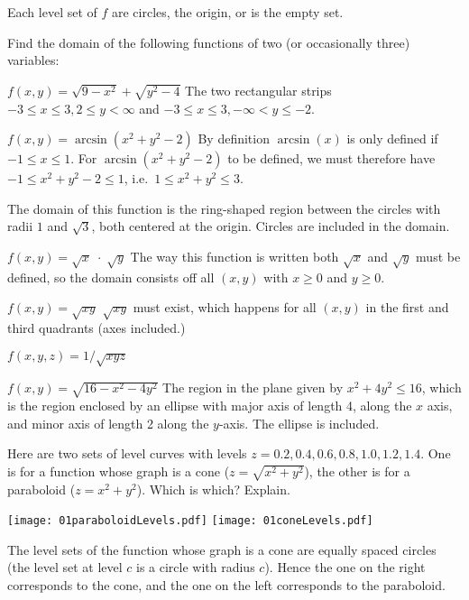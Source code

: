 Each level set of $f$ are circles, the origin, or is the empty set.


\endanswer


\problem Find the domain of the following functions of two (or occasionally
three) variables:

\subprob  $f(x, y) = \sqrt{9-x^2}+\sqrt{y^2-4}$\hspace{5em}
\answer
The two rectangular strips $-3\leq x\leq3, 2\leq y<\infty$ and
$-3\leq x\leq3, -\infty<y\leq-2$.
\endanswer

\subprob  $f(x, y) = \arcsin(x^2+y^2-2)$
\answer
By definition $\arcsin(x)$ is only defined if $-1\leq x\leq1$.
For $\arcsin(x^2+y^2-2)$ to be defined, we must therefore have
$-1\leq x^2+y^2-2 \leq 1$, i.e.\ $1\leq x^2+y^2 \leq 3$.

The domain of this function is 
the ring-shaped region between the circles with radii $1$ and
$\sqrt{3}$, both centered at the origin.
Circles are included in the domain.
\endanswer

\subprob  $f(x, y) = \sqrt{x}\;\cdot\;\sqrt{y}$
\answer
The way this function is written both $\sqrt x$ and $\sqrt y$ must be defined,
so the domain consists off all $(x,y)$ with $x\geq0$ and $y\geq0$. 
\endanswer

\subprob  $f(x, y) = \sqrt{xy}$
\answer
$\sqrt{xy}$ must exist, which happens for all $(x,y)$ in the first
and third quadrants (axes included.)
\endanswer

\subprob  $f(x, y, z) = 1/\sqrt{xyz}$

\subprob  $f(x, y) = \sqrt{16-x^2-4y^2}$
\answer
The region in the plane given by $x^2+4y^2\leq16$, which is the region
enclosed by an ellipse with
major axis of length 4, along the $x$ axis, and minor axis of length
2 along the $y$-axis.  The ellipse is included.
\endanswer

\problem\label{prb:cone-or-paraboloid}
Here are two sets of level curves with levels $z=0.2, 0.4, 0.6, 0.8,
1.0, 1.2,  1.4$.  One is for a function whose graph is a cone
($z=\sqrt{x^2+y^2}$), the other is for a paraboloid ($z=x^2+y^2$).
Which is which? Explain.

\begin{center}
  \texttt{[image: 01paraboloidLevels.pdf]}
  \quad
  \texttt{[image: 01coneLevels.pdf]}
\end{center}
\answer
The level sets of the function whose graph is a cone are equally spaced circles
(the level set at level $c$ is a circle with radius $c$).  Hence the one on the
right corresponds to the cone, and 
the one on the left corresponds to the paraboloid.
\endanswer


